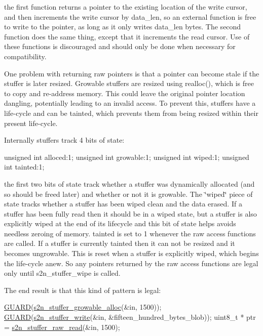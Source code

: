 the first function returns a pointer to the existing location of the write cursor, and then increments the write cursor by data\+\_\+len, so an external function is free to write to the pointer, as long as it only writes data\+\_\+len bytes. The second function does the same thing, except that it increments the read cursor. Use of these functions is discouraged and should only be done when necessary for compatibility.

One problem with returning raw pointers is that a pointer can become stale if the stuffer is later resized. Growable stuffers are resized using realloc(), which is free to copy and re-\/address memory. This could leave the original pointer location dangling, potentially leading to an invalid access. To prevent this, stuffers have a life-\/cycle and can be tainted, which prevents them from being resized within their present life-\/cycle.

Internally stuffers track 4 bits of state\+:


\begin{DoxyCode}
\textcolor{keywordtype}{unsigned} \textcolor{keywordtype}{int} alloced:1;
\textcolor{keywordtype}{unsigned} \textcolor{keywordtype}{int} growable:1;
\textcolor{keywordtype}{unsigned} \textcolor{keywordtype}{int} wiped:1;
\textcolor{keywordtype}{unsigned} \textcolor{keywordtype}{int} tainted:1;
\end{DoxyCode}


the first two bits of state track whether a stuffer was dynamically allocated (and so should be free\textquotesingle{}d later) and whether or not it is growable. The \char`\"{}wiped\char`\"{} piece of state tracks whether a stuffer has been wiped clean and the data erased. If a stuffer has been fully read then it should be in a wiped state, but a stuffer is also explicitly wiped at the end of its lifecycle and this bit of state helps avoids needless zeroing of memory. tainted is set to 1 whenever the raw access functions are called. If a stuffer is currently tainted then it can not be resized and it becomes ungrowable. This is reset when a stuffer is explicitly wiped, which begins the life-\/cycle anew. So any pointers returned by the raw access functions are legal only until s2n\+\_\+stuffer\+\_\+wipe is called.

The end result is that this kind of pattern is legal\+:


\begin{DoxyCode}
\hyperlink{s2n__safety_8h_ad400572229cc8e40f7996837deb680f3}{GUARD}(\hyperlink{s2n__stuffer_8c_aba979c37cd169d15368bcdf473360073}{s2n\_stuffer\_growable\_alloc}(&in, 1500));
\hyperlink{s2n__safety_8h_ad400572229cc8e40f7996837deb680f3}{GUARD}(\hyperlink{s2n__stuffer_8c_ad77ea23089bbeb19b897a73bf6ca3fde}{s2n\_stuffer\_write}(&in, &fifteen\_hundred\_bytes\_blob));
uint8\_t * ptr = \hyperlink{s2n__stuffer_8c_a5148294f6ed0bf894afc83a31ee4f8a5}{s2n\_stuffer\_raw\_read}(&in, 1500);
\end{DoxyCode}


